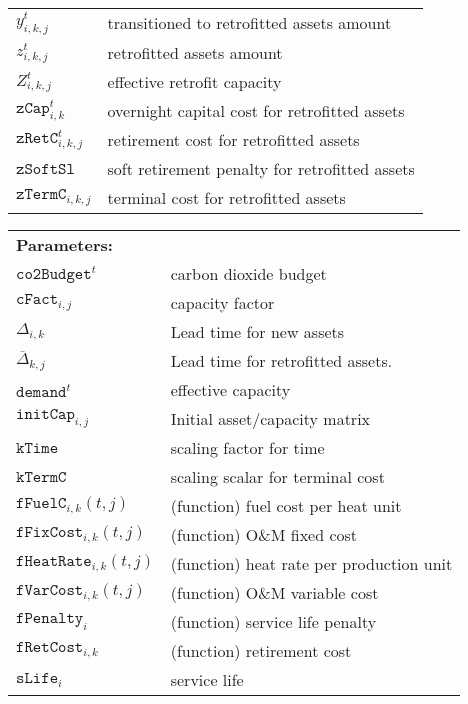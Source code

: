 \documentclass{amsart}
\begin{document}
\begin{centering}
\begin{tabular}{@{}ll@{}}
    $y^t_{i, k,j}$	&	transitioned to retrofitted assets amount	\\
    $z^{t}_{i,k,j}$	&	retrofitted assets amount	\\
    $Z^t_{i,k,j}$	&	effective retrofit capacity	\\
    $\mathtt{zCap}^t_{i,k}$	&	overnight capital cost for retrofitted assets\\
    $\mathtt{zRetC}^t_{i,k,j}$	&	retirement cost for retrofitted assets\\
    $\mathtt{zSoftSl}$	&	soft retirement penalty for retrofitted assets\\
    $\mathtt{zTermC}_{i,k,j}$	&	terminal cost for retrofitted assets\\
\end{tabular}
\end{centering}

\begin{centering}
    \begin{tabular}{@{}ll@{}}
    \textbf{Parameters:} &   \\
    $\mathtt{co2Budget}^t$	&	carbon dioxide budget	\\
    $\mathtt{cFact}_{i,j}$	&	capacity factor	\\
    $\Delta_{i,k}$              &       Lead time for new assets\\
    $\overline{\Delta}_{k,j}$   &       Lead time for retrofitted assets.\\
    $\mathtt{demand}^t$	&	effective capacity	\\
    $\mathtt{initCap}_{i,j}$    &       Initial asset/capacity matrix\\
    $\mathtt{kTime}$	&   scaling factor for time		\\
    $\mathtt{kTermC}$	& scaling scalar for terminal cost		\\
    $\mathtt{fFuelC}_{i,k}(t,j)$	&   (function) fuel cost per heat unit	\\
    $\mathtt{fFixCost}_{i,k}(t,j)$	&   (function) O\&M fixed cost	\\
    $\mathtt{fHeatRate}_{i,k}(t,j)$	&   (function) heat rate per production
    unit \\
    $\mathtt{fVarCost}_{i,k}(t,j)$	&   (function) O\&M variable cost	\\
    $\mathtt{fPenalty}_{i}$	&	(function) service life penalty	\\
    $\mathtt{fRetCost}_{i,k}$	&	(function) retirement cost	\\
    $\mathtt{sLife}_i$	&   service life \\
    \end{tabular}
\end{centering}
\end{document}
